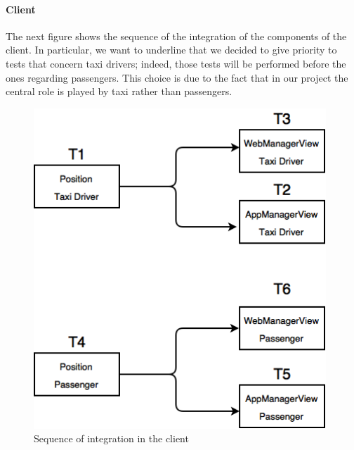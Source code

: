 \paragraph{Client}\mbox{}
\newline
The next figure shows the sequence of the integration of the components of the client.
\newline
In particular, we want to underline that we decided to give priority to tests that concern taxi drivers; indeed, those tests will be performed before the ones regarding passengers. This choice is due to the fact that in our project the central role is played by taxi rather than passengers. 
\newline
\begin{figure}[H]
    \centering
    \includegraphics[width=11cm]{./Images/Client.png}
    \caption{Sequence of integration in the client}
    \label{fig: Sequence of integration in the client}
\end{figure}

\newpage

